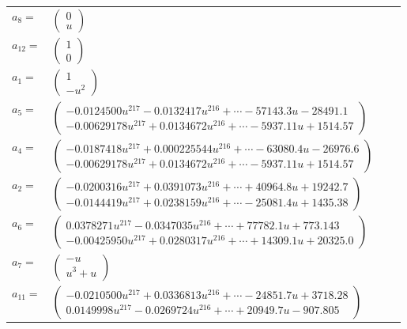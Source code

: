\documentclass[1p]{elsarticle_modified}
\theoremstyle{definition}
\begin{document}
\begin{tabular}{m{7pt} m{180pt} m{7pt} m{180pt} }
\flushright $a_{8}=$&$\begin{pmatrix}0\\u\end{pmatrix}$ \\
\flushright $a_{12}=$&$\begin{pmatrix}1\\0\end{pmatrix}$ \\
\flushright $a_{1}=$&$\begin{pmatrix}1\\- u^2\end{pmatrix}$ \\
\flushright $a_{5}=$&$\begin{pmatrix}-0.0124500 u^{217}-0.0132417 u^{216}+\cdots-57143.3 u-28491.1\\-0.00629178 u^{217}+0.0134672 u^{216}+\cdots-5937.11 u+1514.57\end{pmatrix}$ \\
\flushright $a_{4}=$&$\begin{pmatrix}-0.0187418 u^{217}+0.000225544 u^{216}+\cdots-63080.4 u-26976.6\\-0.00629178 u^{217}+0.0134672 u^{216}+\cdots-5937.11 u+1514.57\end{pmatrix}$ \\
\flushright $a_{2}=$&$\begin{pmatrix}-0.0200316 u^{217}+0.0391073 u^{216}+\cdots+40964.8 u+19242.7\\-0.0144419 u^{217}+0.0238159 u^{216}+\cdots-25081.4 u+1435.38\end{pmatrix}$ \\
\flushright $a_{6}=$&$\begin{pmatrix}0.0378271 u^{217}-0.0347035 u^{216}+\cdots+77782.1 u+773.143\\-0.00425950 u^{217}+0.0280317 u^{216}+\cdots+14309.1 u+20325.0\end{pmatrix}$ \\
\flushright $a_{7}=$&$\begin{pmatrix}- u\\u^3+u\end{pmatrix}$ \\
\flushright $a_{11}=$&$\begin{pmatrix}-0.0210500 u^{217}+0.0336813 u^{216}+\cdots-24851.7 u+3718.28\\0.0149998 u^{217}-0.0269724 u^{216}+\cdots+20949.7 u-907.805\end{pmatrix}$ \\

\end{tabular}
\end{document}
